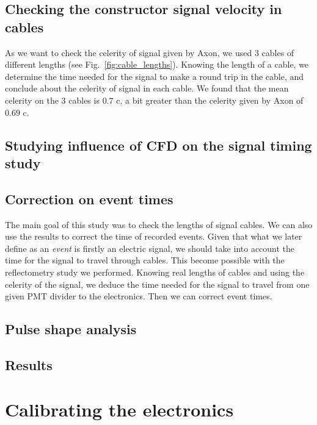 \subsection*{Checking the constructor signal velocity in cables}
\label{subsec:velocity}
As we want to check the celerity of signal given by Axon, we used $3$ cables of different lengths (see Fig.~\ref{fig:cable_lengths}).
Knowing the length of a cable, we determine the time needed for the signal to make a round trip in the cable, and conclude about the celerity of signal in each cable.
We found that the mean celerity on the $3$ cables is $0.7$ c, a bit greater than the celerity given by Axon of $0.69$ c.


\subsection*{Studying influence of CFD on the signal timing study}
\label{subsec:CFD}

\subsection*{Correction on event times}
\label{subsec:time_correction}

The main goal of this study was to check the lengths of signal cables.
We can also use the results to correct the time of recorded events.
Given that what we later define as an \emph{event} is firstly an electric signal, we should take into account the time for the signal to travel through cables.
This become possible with the reflectometry study we performed.
Knowing real lengths of cables and using the celerity of the signal, we deduce the time needed for the signal to travel from one given PMT divider to the electronics.
Then we can correct event times.

\subsection*{Pulse shape analysis}
\label{subsec:pulse_shape}


\subsection{Results}



\section{Calibrating the electronics}
\label{sec:TimeSynchroFEB}

